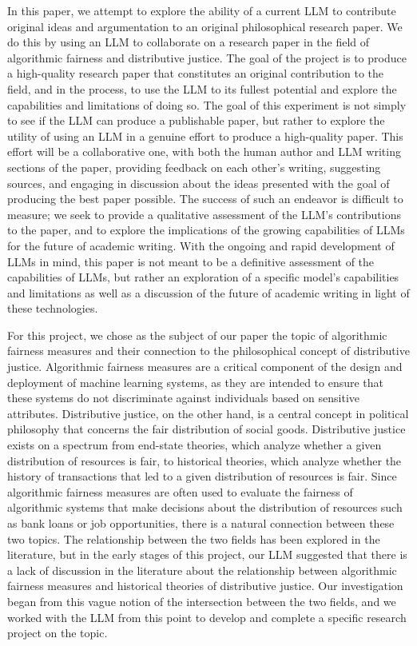 In this paper, we attempt to explore the ability of a current LLM to contribute
original ideas and argumentation to an original philosophical research paper.
We do this by using an LLM to collaborate on a research paper in the field of
algorithmic fairness and distributive justice. The goal of the project is to
produce a high-quality research paper that constitutes an original contribution
to the field, and in the process, to use the LLM to its fullest potential and
explore the capabilities and limitations of doing so. The goal of this
experiment is not simply to see if the LLM can produce a publishable paper, but
rather to explore the utility of using an LLM in a genuine effort to produce a
high-quality paper. This effort will be a collaborative one, with both the human
author and LLM writing sections of the paper, providing feedback on each other's
writing, suggesting sources, and engaging in discussion about the ideas
presented with the goal of producing the best paper possible. The success of
such an endeavor is difficult to measure; we seek to provide a qualitative
assessment of the LLM's contributions to the paper, and to explore the
implications of the growing capabilities of LLMs for the future of academic
writing. With the ongoing and rapid development of LLMs in mind, this paper is
not meant to be a definitive assessment of the capabilities of LLMs, but rather
an exploration of a specific model's capabilities and limitations as well as a
discussion of the future of academic writing in light of these technologies.

For this project, we chose as the subject of our paper the topic of algorithmic
fairness measures and their connection to the philosophical concept of
distributive justice. Algorithmic fairness measures are a critical component of
the design and deployment of machine learning systems, as they are intended to
ensure that these systems do not discriminate against individuals based on
sensitive attributes. Distributive justice, on the other hand, is a central
concept in political philosophy that concerns the fair distribution of social
goods. Distributive justice exists on a spectrum from end-state theories, which
analyze whether a given distribution of resources is fair, to historical
theories, which analyze whether the history of transactions that led to a given
distribution of resources is fair. Since algorithmic fairness measures are often
used to evaluate the fairness of algorithmic systems that make decisions about
the distribution of resources such as bank loans or job opportunities, there is
a natural connection between these two topics. The relationship between the two
fields has been explored in the literature, but in the early stages of this
project, our LLM suggested that there is a lack of discussion in the literature
about the relationship between algorithmic fairness measures and historical
theories of distributive justice. Our investigation began from this vague notion
of the intersection between the two fields, and we worked with the LLM from this
point to develop and complete a specific research project on the topic.

